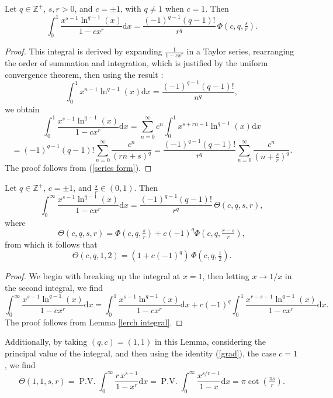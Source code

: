 \documentclass[11pt,reqno]{article}
\begin{document}
\begin{lemma}\label{lerch integral}
	Let $q\in\mathbb{Z}^{+}$, $s,r>0$, and $c=\pm1$, with $q\neq1$ when $c=1$. Then
	\[\int_0^1\frac{x^{s-1}\ln^{q-1}(x)}{1-cx^r}\mathrm{d} x=\frac{{(-1)}^{q-1}(q-1)!}{r^{q}}\,\Phi\left(c,q,\tfrac{s}{r}\right).\]
\end{lemma}
\begin{proof}
	This integral is derived by expanding $\frac{1}{1-c{x}^{r}}$ in a Taylor series, rearranging the order of summation and integration, which is justified by the uniform convergence theorem, then using the result \cite[p.\, 13]{ali}:
	\begin{equation}
		\int_0^1 x^{n-1} \ln^{q-1}(x)\mathrm{d} x=\frac{(-1)^{q-1}(q-1)!}{n^q},\label{classical}
	\end{equation}
	we obtain
	\[\int_0^1\frac{x^{s-1}\ln^{q-1}(x)}{1-cx^r}\mathrm{d} x=\sum_{n=0}^\infty c^n\int_0^1 x^{s+rn-1}\ln^{q-1}(x)\mathrm{d} x\]
	\[=(-1)^{q-1}(q-1)!\sum_{n=0}^\infty\frac{c^n}{{(rn+s)}^{q}}=\frac{(-1)^{q-1}(q-1)!}{r^{q}}\sum_{n=0}^\infty\frac{c^n}{{(n+\tfrac{s}{r})}^{q}}.\]
	The proof follows from (\ref{series form}).
\end{proof}

\begin{lemma} \label{theta integral}
	Let $q\in\mathbb{Z}^+$, $c=\pm1$, and $\frac{s}{r}\in(0,1)$. Then
	\[\int_0^\infty\frac{x^{s-1}\ln^{q-1}(x)}{1-cx^r}\mathrm{d} x=\frac{{(-1)}^{q-1}(q-1)!}{r^{q}}\,\Theta(c,q,s,r),\]
	where
	\begin{equation}
		\Theta(c,q,s,r)=\Phi\left(c,q,\tfrac{s}{r}\right)+c{(-1)}^{q}\Phi\left(c,q,\tfrac{r-s}{r}\right),\label{theta}
	\end{equation}
	from which it follows that
	\[\Theta(c,q,1,2)=(1+c{(-1)}^{q})\,\Phi(c,q,\tfrac12).\]
\end{lemma}
\begin{proof}
	We begin with breaking up the integral at $x=1$, then letting $x\to1/x$ in the second integral, we find
	\[\int_0^\infty\frac{x^{s-1}\ln^{q-1}(x)}{1-cx^r}\mathrm{d} x=\int_0^1\frac{x^{s-1}\ln^{q-1}(x)}{1-cx^r}\mathrm{d} x+c{(-1)}^{q}\int_0^1\frac{x^{r-s-1}\ln^{q-1}(x)}{1-cx^r}\mathrm{d} x.\]
	The proof follows from Lemma \ref{lerch integral}.
\end{proof}

Additionally, by taking $(q,c)=(1,1)$ in this Lemma, considering the principal value of the integral, and then using the identity (\ref{grad}), the case $c=1$, we find
\[\Theta(1,1,s,r)=\operatorname{P.V.}\int_0^\infty\frac{r\,x^{s-1}}{1-x^r}\mathrm{d} x=\operatorname{P.V.}\int_0^\infty\frac{x^{s/r-1}}{1-x}\mathrm{d} x=\pi\cot\left(\tfrac{\pi s}{r}\right).\] 
\end{document}
